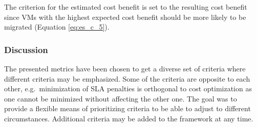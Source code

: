 The criterion for the estimated cost benefit is set to the resulting cost benefit since VMs with the highest expected cost benefit should be more likely to be migrated (Equation \ref{eq:es_c_5}). 


\subsubsection{Discussion}

The presented metrics have been chosen to get a diverse set of criteria where different criteria may be emphasized. Some of the criteria are opposite to each other, e.g.~minimization of SLA penalties is orthogonal to cost optimization as one cannot be minimized without affecting the other one. The goal was to provide a flexible means of prioritizing criteria to be able to adjust to different circumstances. Additional criteria may be added to the framework at any time. 



